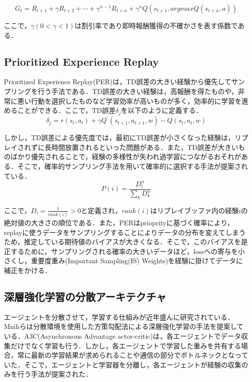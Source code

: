 \documentclass[12pt]{sonota/aislab}
\begin{document}
\begin{equation}
\label{multi-step}
G_{t}=R_{t+1}+\gamma R_{t+2}+\cdots+\gamma^{n-1}R_{t+n}+\gamma^n Q(s_{t+1},argmaxQ(s_{t+n},a))
\end{equation}

ここで，$\gamma(0<\gamma<1)$は割引率であり即時報酬獲得の不確かさを表す係数である．
\subsection{Prioritized Experience Replay}
Prioritized Experience Replay(PER)は，TD誤差の大きい経験から優先してサンプリングを行う手法である\cite{prioritized}．TD誤差の大きい経験は，高報酬を得たものや，非常に悪い行動を選択したものなど学習効率が高いものが多く，効率的に学習を進めることができる．ここで，TD誤差$\delta_{j}$を以下のように定義する．
\begin{equation}
\label{TD_error}
  \delta_{j}=r(s_{t},a_{t})+\gamma Q^{\prime}(s_{t+1},a_{t+1},w)-Q(s_{t},a_{t},w)
\end{equation}

しかし，TD誤差による優先度では，最初にTD誤差が小さくなった経験は，リプレイされずに長時間放置されるといった問題がある．また，TD誤差が大きいものばかり優先されることで，経験の多様性が失われ過学習につながるおそれがある．そこで，確率的サンプリング手法を用いて確率的に選択する手法が提案されている．
\begin{equation}
\label{sum_P_i}
  P(i)=\frac{D_{i}^{\alpha}}{\sum_{k}D_{k}^{\alpha}}
\end{equation}

ここで，$D_{i}=\frac{1}{rank(i)}>0$と定義され，$rank(i)$はリプレイブッファ内の経験$i$の絶対値の大きさの順位である．また，PERはprioprityに基づく確率により，replayに使うデータをサンプリングすることによりデータの分布を変えてしまうため，推定している期待値のバイアスが大きくなる．そこで，このバイアスを是正するために，サンプリングされる確率の大きいデータほど，lossへの寄与を小さくし，重要度重み(Important Sampling(IS) Weights)を経験に掛けてデータに補正をかける．

\subsection{深層強化学習の分散アーキテクチャ}
エージェントを分散させて，学習する仕組みが近年盛んに研究されている\cite{A3C}\cite{Gorila}\cite{Ape-X}．Mnihらは分散環境を使用した方策勾配法による深層強化学習の手法を提案している\cite{A3C}．A3C(Asynchronous Advantage actor-critic)は，各エージェントでデータ収集だけでなく学習も行う．しかし，各エージェントで学習した重みを共有する場合，常に最新の学習結果が求められることや通信の部分でボトルネックとなっていた．そこで，エージェントと学習器を分離し，各エージェントが経験の収集のみを行う手法が提案された\cite{Gorila}\cite{Ape-X}．
\end{document}

